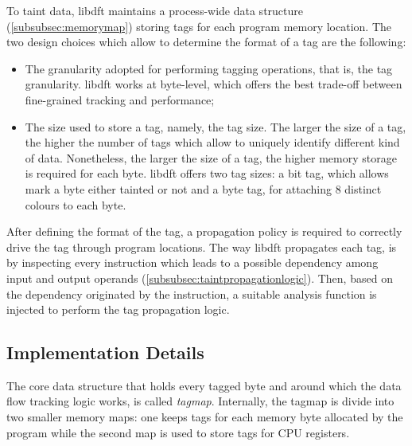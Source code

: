 \documentclass[LaM,binding=0.6cm]{sapthesis}
\begin{document}
To taint data, libdft maintains a process-wide data structure (\autoref{subsubsec:memorymap}) storing tags for each program memory location. The two design choices which allow to determine the format of a tag are the following:
\begin{itemize}
\item The granularity adopted for performing tagging operations, that is, the tag granularity. libdft works at byte-level, which offers the best trade-off between fine-grained tracking and performance;
\item The size used to store a tag, namely, the tag size. The larger the size of a tag, the higher the number of tags which allow to uniquely identify different kind of data. Nonetheless, the larger the size of a tag, the higher memory storage is required for each byte. libdft offers two tag sizes: a bit tag, which allows mark a byte either tainted or not and a byte tag, for attaching $8$ distinct colours to each byte.
\end{itemize}
After defining the format of the tag, a propagation policy is required to correctly drive the tag through program locations. The way libdft propagates each tag, is by inspecting every instruction which leads to a possible dependency among input and output operands (\autoref{subsubsec:taintpropagationlogic}). Then, based on the dependency originated by the instruction, a suitable analysis function is injected to perform the tag propagation logic.

\subsection{Implementation Details}
The core data structure that holds every tagged byte and around which the data flow tracking logic works, is called \textit{tagmap}. Internally, the tagmap is divide into two smaller memory maps: one keeps tags for each memory byte allocated by the program while the second map is used to store tags for CPU registers.
\end{document}
